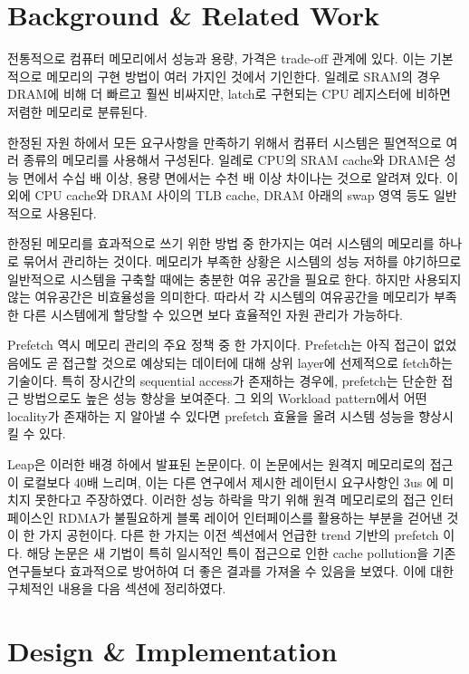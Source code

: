 \documentclass[conference,11pt]{IEEEtran}
\begin{document}
\begin{CJK}{UTF8}{}
    \section{Background \& Related Work} \label{sec:background}

    전통적으로 컴퓨터 메모리에서 성능과 용량, 가격은 trade-off 관계에 있다. 이는 기본적으로 메모리의 구현 방법이 여러 가지인 것에서 기인한다. 일례로 SRAM의 경우 DRAM에 비해 더 빠르고 훨씬 비싸지만, latch로 구현되는 CPU 레지스터에 비하면 저렴한 메모리로 분류된다.

    한정된 자원 하에서 모든 요구사항을 만족하기 위해서 컴퓨터 시스템은 필연적으로 여러 종류의 메모리를 사용해서 구성된다. 일례로 CPU의 SRAM cache와 DRAM은 성능 면에서 수십 배 이상, 용량 면에서는 수천 배 이상 차이나는 것으로 알려져 있다. 이외에 CPU cache와 DRAM 사이의 TLB cache, DRAM 아래의 swap 영역 등도 일반적으로 사용된다.

    한정된 메모리를 효과적으로 쓰기 위한 방법 중 한가지는 여러 시스템의 메모리를 하나로 묶어서 관리하는 것이다. 메모리가 부족한 상황은 시스템의 성능 저하를 야기하므로 일반적으로 시스템을 구축할 때에는 충분한 여유 공간을 필요로 한다. 하지만 사용되지 않는 여유공간은 비효율성을 의미한다. 따라서 각 시스템의 여유공간을 메모리가 부족한 다른 시스템에게 할당할 수 있으면 보다 효율적인 자원 관리가 가능하다.

    Prefetch 역시 메모리 관리의 주요 정책 중 한 가지이다. Prefetch는 아직 접근이 없었음에도 곧 접근할 것으로 예상되는 데이터에 대해 상위 layer에 선제적으로 fetch하는 기술이다. 특히 장시간의 sequential access가 존재하는 경우에, prefetch는 단순한 접근 방법으로도 높은 성능 향상을 보여준다. 그 외의 Workload pattern에서 어떤 locality가 존재하는 지 알아낼 수 있다면 prefetch 효율을 올려 시스템 성능을 향상시킬 수 있다.

    Leap은 이러한 배경 하에서 발표된 논문이다. 이 논문에서는 원격지 메모리로의 접근이 로컬보다 40배 느리며, 이는 다른 연구에서 제시한 레이턴시 요구사항인 3us \cite{osdi16} 에 미치지 못한다고 주장하였다. 이러한 성능 하락을 막기 위해 원격 메모리로의 접근 인터페이스인 RDMA가 불필요하게 블록 레이어 인터페이스를 활용하는 부분을 걷어낸 것이 한 가지 공헌이다. 다른 한 가지는 이전 섹션에서 언급한 trend 기반의 prefetch 이다. 해당 논문은 새 기법이 특히 일시적인 특이 접근으로 인한 cache pollution을 기존 연구들보다 효과적으로 방어하여 더 좋은 결과를 가져올 수 있음을 보였다. 이에 대한 구체적인 내용을 다음 섹션에 정리하였다.

    \section{Design \& Implementation} \label{sec:design}


\end{CJK}
\end{document}
